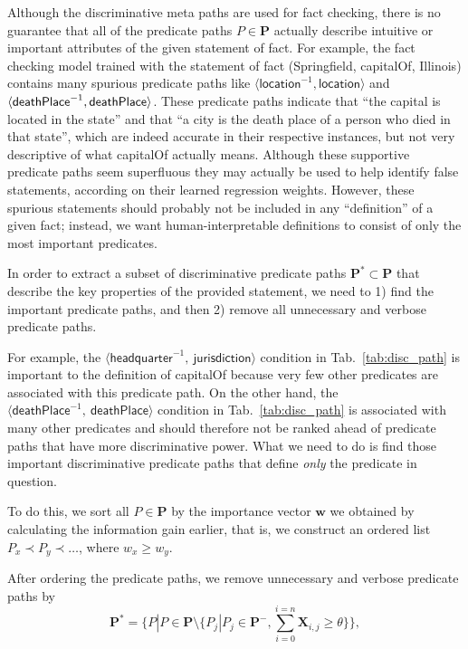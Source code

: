 \documentclass[reprint,twocolumn,showpacs,preprintnumbers,amsmath, aps,pre,amssymb]{revtex4-1}
\begin{document}
Although the discriminative meta paths are used for fact checking, there is no guarantee that all of the predicate paths $P \in \mathbf{P}$ actually describe intuitive or important attributes of the given statement of fact. For example, the fact checking model trained with the statement of fact (\textsf{Springfield}, \textsf{capitalOf}, \textsf{Illinois}) contains many spurious predicate paths like $\langle\textsf{location}^{-1}, \textsf{location}\rangle$ and $\langle\textsf{deathPlace}^{-1}, \\ \textsf{deathPlace}\rangle$. These predicate paths indicate that ``the capital is located in the state'' and that ``a city is the death place of a person who died in that state'', which are indeed accurate in their respective instances, but not very descriptive of what \textsf{capitalOf} actually means. Although these supportive predicate paths seem superfluous they may actually be used to help identify false statements, according on their learned regression weights. However, these spurious statements should probably not be included in any ``definition'' of a given fact; instead, we want human-interpretable definitions to consist of only the most important predicates.


In order to extract a subset of discriminative predicate paths $\mathbf{P}^{*}\subset \mathbf{P}$ that describe the key properties of the provided statement, we need to 1) find the important predicate paths, and then 2) remove all unnecessary and verbose predicate paths. 

For example, the $\langle\textsf{headquarter}^{-1}, \ \textsf{jurisdiction}\rangle$ condition in Tab.~\ref{tab:disc_path} is important to the definition of \textsf{capitalOf} because very few other predicates are associated with this predicate path. On the other hand, the $\langle\textsf{deathPlace}^{-1}, \ \textsf{deathPlace}\rangle$ condition in Tab.~\ref{tab:disc_path} is associated with many other predicates and should therefore not be ranked ahead of predicate paths that have more discriminative power. What we need to do is find those important discriminative predicate paths that define \emph{only} the predicate in question.


To do this, we sort all $P \in \mathbf{P}$ by the importance vector $\mathbf{w}$ we obtained by calculating the information gain earlier, that is, we construct an ordered list $P_x \prec P_y \prec \ldots$, where $w_x \geq w_y$.

After ordering the predicate paths, we remove unnecessary and verbose predicate paths by
\begin{equation}
\mathbf{P}^* = \{ P | P \in \mathbf{P} \setminus \{ P_j | P_j \in \mathbf{P}^-, \sum_{i=0}^{i=n}\mathbf{X}_{i,j} \geq \theta \} \},
\end{equation}
\end{document}
